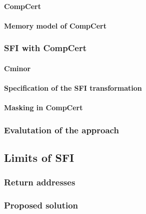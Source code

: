 \documentclass[11pt]{sdm}
\begin{document}
\paragraph{CompCert}
\label{par:CompCert}
\paragraph{Memory model of CompCert}
\label{par:Memory model of CompCert}


\subsubsection{SFI with CompCert}
\label{ssub:SFI with CompCert}
\paragraph{Cminor}
\label{par:Cminor}
\paragraph{Specification of the SFI transformation}
\label{par:Specification of the SFI tranformation}
\paragraph{Masking in CompCert}
\label{par:Masking in CompCert}




\subsubsection{Evalutation of the approach}
\label{ssub:Evalutation of the approach}

\subsection{Limits of SFI}
\label{sub:Limits of SFI}
\subsubsection{Return addresses}
\label{ssub:Return addresses}
\subsubsection{Proposed solution}
\label{ssub:Proposed solution}
\end{document}
